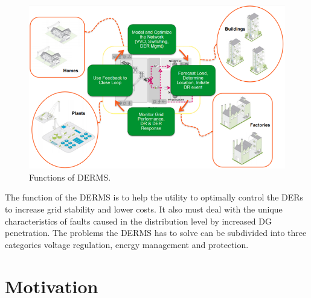 \begin{figure}[!h]
\centering
\includegraphics[width=0.85\linewidth]{figs/DERMS_ARCH.png}
\caption[Functions of DERMS.]{Functions of DERMS. \cite{DERMS_1}}
\label{fig:DERMS_ARCH}
\end{figure}

The function of the DERMS is to help the utility to optimally control the DERs to increase grid stability and lower costs. It also must deal with the unique characteristics of faults caused in the distribution level by increased DG penetration. The problems the DERMS has to solve can be subdivided into three categories voltage regulation, energy management and protection. 

\section{Motivation}
